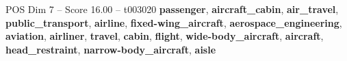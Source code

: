 \begin{textsample}{POS Dim 7 – Score 16.00 – t003020}  \label{ex:f7_pos_029}
\textbf{passenger}, \textbf{aircraft\_cabin}, \textbf{air\_travel}, \textbf{public\_transport}, \textbf{airline}, \textbf{fixed-wing\_aircraft}, \textbf{aerospace\_engineering}, \textbf{aviation}, \textbf{airliner}, \textbf{travel}, \textbf{cabin}, \textbf{flight}, \textbf{wide-body\_aircraft}, \textbf{aircraft}, \textbf{head\_restraint}, \textbf{narrow-body\_aircraft}, \textbf{aisle}

\end{textsample}
